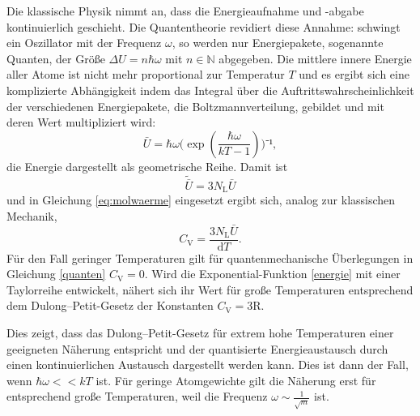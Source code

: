 Die klassische Physik nimmt an, dass die Energieaufnahme und -abgabe kontinuierlich geschieht.
Die Quantentheorie revidiert diese Annahme: 
schwingt ein Oszillator mit der Frequenz $\omega$, so werden nur Energiepakete, sogenannte Quanten, der Größe $\Delta{U}=n \hbar \omega$ mit $n\in\mathbb{N} $ abgegeben.
Die mittlere innere Energie aller Atome ist nicht mehr proportional zur Temperatur $T$ und es ergibt sich eine komplizierte Abhängigkeit indem das Integral über die Auftrittswahrscheinlichkeit der verschiedenen Energiepakete, die Boltzmannverteilung, gebildet und mit deren Wert multipliziert wird:
\begin{equation}
	{\bar{U}=\hbar\omega(\exp(\frac{\hbar\omega}{kT-1})})⁻¹,
	\label{energie}
\end{equation}
die Energie dargestellt als geometrische Reihe.
Damit ist
\begin{equation}
	\tilde{{\bar{U}}}=3N_\mathup{L}\bar{U}
\end{equation}
und in Gleichung \eqref{eq:molwaerme} eingesetzt ergibt sich, analog zur klassischen Mechanik,    
\begin{equation}
	C_\mathup{V}=\frac{3N_\mathup{L}\bar{U}}{\mathup{d}T}.
	\label{quanten}
\end{equation}
Für den Fall geringer Temperaturen gilt für quantenmechanische Überlegungen in Gleichung \eqref{quanten} $C_\mathup{V}=0$. 
Wird die Exponential-Funktion \eqref{energie} mit einer Taylorreihe entwickelt, nähert sich ihr Wert für große Temperaturen entsprechend dem Dulong--Petit-Gesetz der Konstanten $C_\mathup{V}=3\text{R}$.

Dies zeigt, dass das Dulong--Petit-Gesetz für extrem hohe Temperaturen einer geeigneten Näherung entspricht und der quantisierte Energieaustausch durch einen kontinuierlichen Austausch dargestellt werden kann. 
Dies ist dann der Fall, wenn $\hbar\omega<<kT$ ist. 
Für geringe Atomgewichte gilt die Näherung erst für entsprechend große Temperaturen, weil die Frequenz $\omega\sim\frac{1}{\sqrt{m}}$ ist.



